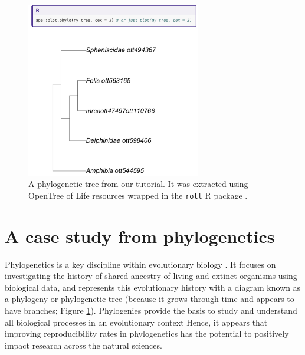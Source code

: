\documentclass[12pt]{article}
\begin{document}
\begin{figure}
\begin{center}
\includegraphics[width=3in]{fig-tree.png}
\end{center}
\caption{A phylogenetic tree from our tutorial. It was extracted using OpenTree of Life resources \citep{opentreeoflife2019synth} wrapped in the \texttt{rotl} R package \citep{michonneau2016rotl}. \label{fig:tree}}
\end{figure}

\section*{A case study from phylogenetics}
\label{sec:case}

Phylogenetics is a key discipline within evolutionary biology \citep{dobzhansky1973nothing}.
It focuses on investigating the history of shared ancestry of living and extinct
organisms using biological data,
and represents this evolutionary history with a diagram known as a phylogeny
or phylogenetic tree (because it grows through time and appears to have branches;
Figure \ref{fig:tree}).
Phylogenies provide the basis to study and understand all biological processes
in an evolutionary context \citep{dobzhansky1973nothing}
Hence, it appears that improving reproducibility rates in phylogenetics has the
potential to positively impact research across the natural sciences.
\end{document}
